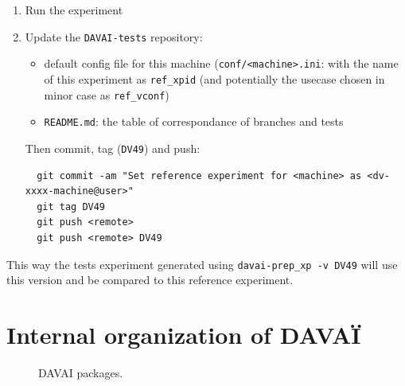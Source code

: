 \documentclass[a4paper,10pt,twoside]{article}
\begin{document}
\begin{appendix}
\begin{enumerate}[label=\arabic*),start=0]
\begin{itemize}
 \end{itemize}
 \item Run the experiment
 \item Update the \texttt{DAVAI-tests} repository:
 \begin{itemize}
  \item default config file for this machine (\texttt{conf/<machine>.ini}: with the name of this experiment as \texttt{ref\_xpid} (and potentially the usecase chosen in minor case as \texttt{ref\_vconf})
  \item \texttt{README.md}: the table of correspondance of branches and tests
 \end{itemize}
 Then commit, tag (\texttt{DV49}) and push:
 \begin{verbatim}
  git commit -am "Set reference experiment for <machine> as <dv-xxxx-machine@user>"
  git tag DV49
  git push <remote>
  git push <remote> DV49
 \end{verbatim}
\end{enumerate}

\noindent This way the tests experiment generated using \texttt{davai-prep\_xp -v DV49} will use this version and be compared to this reference experiment.








\newpage
\section{Internal organization of DAVAÏ}

\begin{figure}[h!]\hspace{-2cm}
 \begin{center}\hspace{-2cm}
 \end{center}
 \caption{\label{fig:davai_ecosystem} DAVAI packages.}
\end{figure}



\end{appendix}
\end{document}
